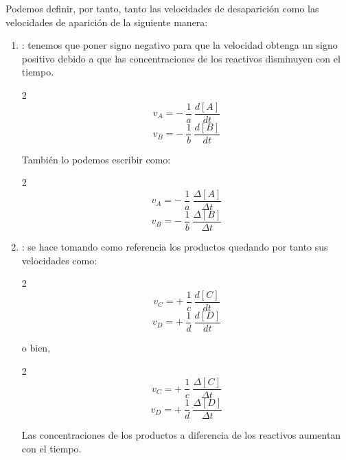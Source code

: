     Podemos definir, por tanto, tanto las velocidades de desaparición como las velocidades de aparición de la siguiente manera:
    \begin{enumerate}[label=\numberballmDarkTeal]
        \item {}: tenemos que poner signo negativo para que la velocidad obtenga un signo positivo debido a que las concentraciones de los reactivos disminuyen con el tiempo.
        \begin{paracol}{2}
            \begin{equation}
                v_A = -\ \dfrac{1}{a}\ \dfrac{d[A]}{dt}\label{eq:velocidad-a}
            \end{equation}
            \switchcolumn
            \begin{equation}
                v_B = -\ \dfrac{1}{b}\ \dfrac{d[B]}{dt}\label{eq:velocidadb}
            \end{equation}
        \end{paracol}
        También lo podemos escribir como:
        \begin{paracol}{2}
            \begin{equation}
                v_A = -\ \dfrac{1}{a}\ \dfrac{\Delta[A]}{\Delta t}\label{eq:velocidad-a-incremento}
            \end{equation}
            \switchcolumn
            \begin{equation}
                v_B = -\ \dfrac{1}{b}\ \dfrac{\Delta[B]}{\Delta t}\label{eq:velicudad-b-incremento}
            \end{equation}
        \end{paracol}
        \item {}: se hace tomando como referencia los productos quedando por tanto sus velocidades como:
        \begin{paracol}{2}
            \begin{equation}
                v_C = +\ \dfrac{1}{c}\ \dfrac{d[C]}{dt}\label{eq:velocidad-c}
            \end{equation}
            \switchcolumn
            \begin{equation}
                v_D= +\ \dfrac{1}{d}\ \dfrac{d[D]}{dt}\label{eq:velocidadd-d}
            \end{equation}
        \end{paracol}
        o bien,
        \begin{paracol}{2}
            \begin{equation}
                v_C = +\ \dfrac{1}{c}\ \dfrac{\Delta[C]}{\Delta t}\label{eq:velocidad-c-incremento}
            \end{equation}
            \switchcolumn
            \begin{equation}
                v_D= +\ \dfrac{1}{d}\ \dfrac{\Delta [D]}{\Delta t}\label{eq:velocidad-d-incremento}
            \end{equation}
        \end{paracol}
        Las concentraciones de los productos a diferencia de los reactivos aumentan con el tiempo.
    \end{enumerate}
